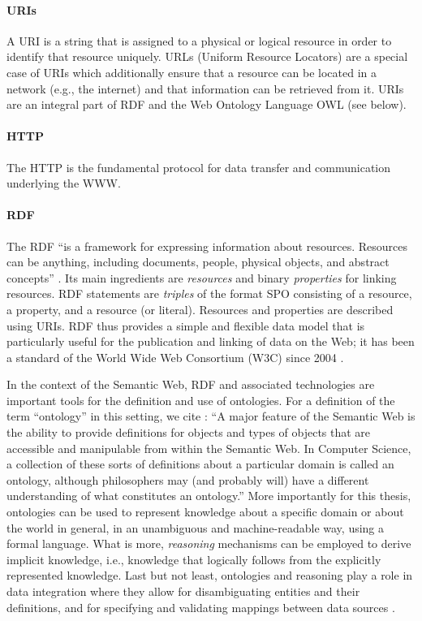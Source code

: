 \paragraph{URIs}
A \gls{URI} is a string that is assigned to a physical or logical resource
in order to identify that resource uniquely. URLs (Uniform Resource Locators)
are a special case of URIs which additionally ensure that a resource
can be located in a network (e.g., the internet) and that information can be retrieved from it.
URIs are an integral part of RDF and the Web Ontology Language OWL (see below).

\paragraph{HTTP}
The \gls{HTTP} is the fundamental protocol for data transfer and communication underlying the \gls{WWW}.

\paragraph{RDF}
The \gls{RDF} \enquote{is a framework for expressing information about resources. Resources can be anything, including documents, people, physical objects, and abstract concepts}
\autocite{RDFPrimer}.
Its main ingredients are \emph{resources} and binary \emph{properties} for linking resources.
RDF statements are \emph{triples} of the format \gls{SPO}
consisting of a resource, a property, and a resource (or literal).
Resources and properties are described using \glspl{URI}.
RDF thus provides a simple and flexible data model that is particularly useful for the publication
and linking of data on the Web;
it has been a standard of the
World Wide Web Consortium (W3C) since 2004 \autocite{W3CRDF}.

\par\medskip
In the context of the Semantic Web, \gls{RDF} and associated technologies
are important tools for the definition and use of ontologies.
For a definition of the term \enquote{ontology} in this setting, we cite \textcite{Horrocks2011}:
\enquote{A major feature of the Semantic Web is the ability to provide definitions for objects and types of objects that are accessible and manipulable from within the Semantic Web. In Computer Science, a collection of these sorts of definitions about a particular domain is called an ontology, although philosophers may (and probably will) have a different understanding of what constitutes an ontology.}
More importantly for this thesis, ontologies can be used to represent knowledge about a specific domain
or about the world in general, in an unambiguous and machine-readable way, using a formal language.
What is more, \emph{reasoning} mechanisms can be employed to derive implicit knowledge,
i.e., knowledge that logically follows from the explicitly represented knowledge.
Last but not least, ontologies and reasoning play a role in data integration
where they allow for disambiguating entities and their definitions,
and for specifying and validating mappings between data sources
\autocites[cf.][]{Wache2001}[§12]{Doan2012}.

